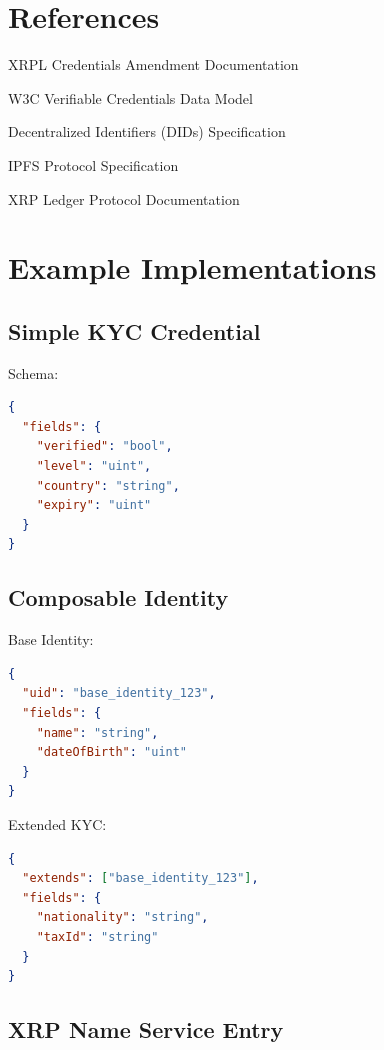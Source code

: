 \documentclass[11pt,a4paper]{article}
\begin{document}
\section*{References}

\begin{enumerate}[label={[\arabic*]}]
    \item XRPL Credentials Amendment Documentation
    \item W3C Verifiable Credentials Data Model
    \item Decentralized Identifiers (DIDs) Specification
    \item IPFS Protocol Specification
    \item XRP Ledger Protocol Documentation
\end{enumerate}

\appendix

\section{Example Implementations}

\subsection{Simple KYC Credential}

Schema:
\begin{lstlisting}[language=json]
{
  "fields": {
    "verified": "bool",
    "level": "uint",
    "country": "string",
    "expiry": "uint"
  }
}
\end{lstlisting}

\subsection{Composable Identity}

Base Identity:
\begin{lstlisting}[language=json]
{
  "uid": "base_identity_123",
  "fields": {
    "name": "string",
    "dateOfBirth": "uint"
  }
}
\end{lstlisting}

Extended KYC:
\begin{lstlisting}[language=json]
{
  "extends": ["base_identity_123"],
  "fields": {
    "nationality": "string",
    "taxId": "string"
  }
}
\end{lstlisting}

\subsection{XRP Name Service Entry}
\end{document}
